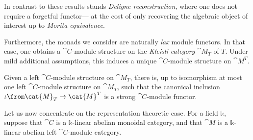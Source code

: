 \documentclass[portrait, noFonts]{betterposter/betterposter}
\renewcommand{\k}{\mathbb{k}}
\begin{document}
{  In contrast to these results stands \emph{Deligne reconstruction},
  where one does not require a forgetful functor—%
  at the cost of only recovering the algebraic object of interest up to \emph{Morita equivalence}.
}{                                                             %
  \bigskip
  Furthermore, the monads we consider are naturally \emph{lax} module functors.
  In that case, one obtains a \(\cat{C}\)-module structure on the \emph{Kleisli category} \(\cat{M}_T\) of \(T\).
  Under mild additional assumptions,
  this induces a unique \(\cat{C}\)-module structure on \(\cat{M}^T\).\\[-0.6em]
  \begin{highlight}
    Given a left \(\cat{C}\)-module structure on \(\cat{M}_T\),
    there is, up to isomorphism at most one left \(\cat{C}\)-module structure on \(\cat{M}_T\),
    such that the canonical inclusion \(\iota\from \cat{M}_T \to \cat{M}^T\) is a strong \(\cat{C}\)-module functor.
  \end{highlight}
  Let us now concentrate on the representation theoretic case.
  For a field \(\k\), suppose that \(\cat{C}\) is a \(\k\)-linear abelian monoidal category,
  and that \(\cat{M}\) is a \(\k\)-linear abelian left \(\cat{C}\)-module category.
}

\end{document}
